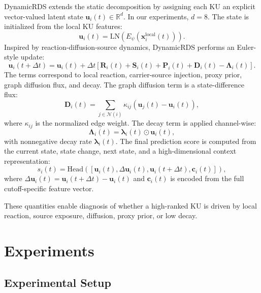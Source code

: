 \documentclass[conference]{IEEEtran}
\begin{document}
DynamicRDS extends the static decomposition by assigning each KU an explicit vector-valued latent state $\mathbf{u}_i(t)\in\mathbb{R}^d$. In our experiments, $d=8$. The state is initialized from the local KU features:
\begin{equation}
\mathbf{u}_i(t) = \mathrm{LN}\left(E_\psi(\mathbf{x}_i^{\mathrm{local}}(t))\right).
\end{equation}
Inspired by reaction-diffusion-source dynamics, DynamicRDS performs an Euler-style update:
\begin{equation}
\mathbf{u}_i(t+\Delta t)
=
\mathbf{u}_i(t)
+
\Delta t
\left[
\mathbf{R}_i(t)
+
\mathbf{S}_i(t)
+
\mathbf{P}_i(t)
+
\mathbf{D}_i(t)
-
\boldsymbol{\Lambda}_i(t)
\right].
\label{eq:dynamic_rds}
\end{equation}
The terms correspond to local reaction, carrier-source injection, proxy prior, graph diffusion flux, and decay. The graph diffusion term is a state-difference flux:
\begin{equation}
\mathbf{D}_i(t)
=
\sum_{j\in\mathcal{N}(i)}
\kappa_{ij}
\left(
\mathbf{u}_j(t)-\mathbf{u}_i(t)
\right),
\label{eq:flux}
\end{equation}
where $\kappa_{ij}$ is the normalized edge weight. The decay term is applied channel-wise:
\begin{equation}
\boldsymbol{\Lambda}_i(t)=\boldsymbol{\lambda}_i(t)\odot \mathbf{u}_i(t),
\end{equation}
with nonnegative decay rate $\boldsymbol{\lambda}_i(t)$. The final prediction score is computed from the current state, state change, next state, and a high-dimensional context representation:
\begin{equation}
s_i(t)=
\mathrm{Head}\left(
[
\mathbf{u}_i(t),
\Delta \mathbf{u}_i(t),
\mathbf{u}_i(t+\Delta t),
\mathbf{c}_i(t)
]
\right),
\end{equation}
where $\Delta \mathbf{u}_i(t)=\mathbf{u}_i(t+\Delta t)-\mathbf{u}_i(t)$ and $\mathbf{c}_i(t)$ is encoded from the full cutoff-specific feature vector.

These quantities enable diagnosis of whether a high-ranked KU is driven by local reaction, source exposure, diffusion, proxy prior, or low decay.

\section{Experiments}

\subsection{Experimental Setup}
\end{document}
